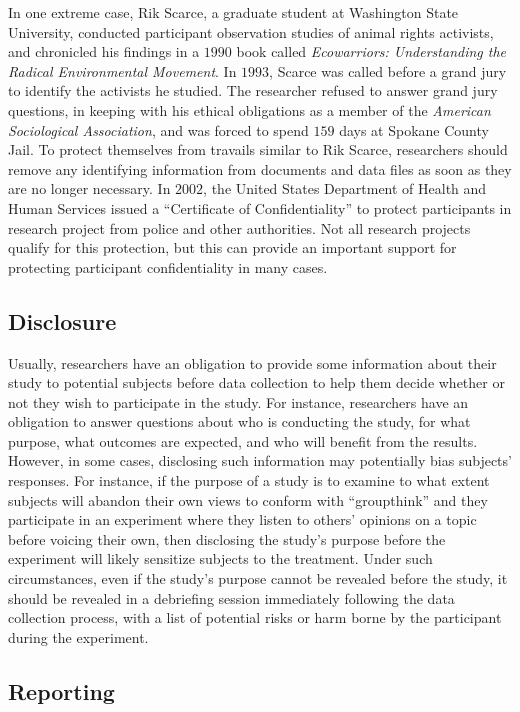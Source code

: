 In one extreme case, Rik Scarce, a graduate student at Washington State University, conducted participant observation studies of animal rights activists, and chronicled his findings in a $ 1990 $ book called \textit{Ecowarriors: Understanding the Radical Environmental Movement}\cite{scarce2016eco}. In $ 1993 $, Scarce was called before a grand jury to identify the activists he studied. The researcher refused to answer grand jury questions, in keeping with his ethical obligations as a member of the \textit{American Sociological Association}, and was forced to spend $ 159 $ days at Spokane County Jail. To protect themselves from travails similar to Rik Scarce, researchers should remove any identifying information from documents and data files as soon as they are no longer necessary. In $ 2002 $, the United States Department of Health and Human Services issued a ``Certificate of Confidentiality'' to protect participants in research project from police and other authorities. Not all research projects qualify for this protection, but this can provide an important support for protecting participant confidentiality in many cases.

\subsection{Disclosure}

Usually, researchers have an obligation to provide some information about their study to potential subjects before data collection to help them decide whether or not they wish to participate in the study. For instance, researchers have an obligation to answer questions about who is conducting the study, for what purpose, what outcomes are expected, and who will benefit from the results. However, in some cases, disclosing such information may potentially bias subjects' responses. For instance, if the purpose of a study is to examine to what extent subjects will abandon their own views to conform with ``groupthink'' and they participate in an experiment where they listen to others' opinions on a topic before voicing their own, then disclosing the study's purpose before the experiment will likely sensitize subjects to the treatment. Under such circumstances, even if the study's purpose cannot be revealed before the study, it should be revealed in a debriefing session immediately following the data collection process, with a list of potential risks or harm borne by the participant during the experiment.


\subsection{Reporting}

